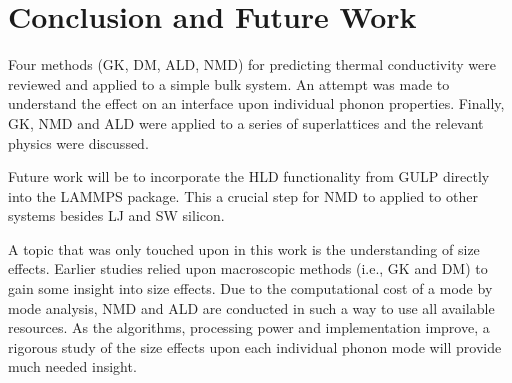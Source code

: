 \chapter{Conclusion and Future Work}

Four methods (GK, DM, ALD, NMD) for predicting thermal conductivity were reviewed and applied to a simple bulk system. An attempt was made to understand the effect on an interface upon individual phonon properties. Finally, GK, NMD and ALD were applied to a series of superlattices and the relevant physics were discussed.

Future work will be to incorporate the HLD functionality from GULP directly into the LAMMPS package. This a crucial step for NMD to applied to other systems besides LJ and SW silicon.

A topic that was only touched upon in this work is the understanding of size effects. Earlier studies relied upon macroscopic methods (i.e., GK and DM) to gain some insight into size effects. Due to the computational cost of a mode by mode analysis, NMD and ALD are conducted in such a way to use all available resources. As the algorithms, processing power and implementation improve, a rigorous study of the size effects upon each individual phonon mode will provide much needed insight.

